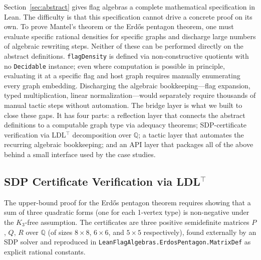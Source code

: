\documentclass{article}
\newcommand{\Q}{\mathbb{Q}}
\newcommand{\lean}[1]{\texttt{#1}}
\begin{document}
Section~\ref{sec:abstract} gives flag algebras a complete mathematical
specification in Lean.  The difficulty is that this specification cannot
drive a concrete proof on its own.  To prove Mantel's theorem or the
Erd\H{o}s pentagon theorem, one must evaluate specific rational densities
for specific graphs and discharge large numbers of algebraic
rewriting steps.  Neither of these can be performed directly on the
abstract definitions.  \lean{flagDensity} is defined via non-constructive
quotients with no \lean{Decidable} instance; even where computation is
possible in principle, evaluating it at a specific flag and host graph
requires manually enumerating every graph embedding.  Discharging the
algebraic bookkeeping---flag expansion, typed multiplication, linear
normalization---would separately require thousands of manual tactic steps
without automation.  The bridge layer is what we built
to close these gaps.  It has four parts: a reflection layer that connects
the abstract definitions to a computable graph type via adequacy theorems;
SDP-certificate verification via LDL$^\top$ decomposition over $\Q$; a
tactic layer that automates the recurring algebraic bookkeeping; and an API
layer that packages all of the above behind a small interface used by the
case studies.

\subsection{SDP Certificate Verification via \texorpdfstring{LDL$^\top$}{LDL\string^T}}
\label{sec:sdp}

The upper-bound proof for the Erd\H{o}s pentagon theorem requires showing
that a sum of three quadratic forms (one for each 1-vertex type) is
non-negative under the $K_3$-free assumption.  The certificates are three
positive semidefinite matrices $P$, $Q$, $R$ over $\Q$ (of sizes
$8 \times 8$, $6 \times 6$, and $5 \times 5$ respectively), found
externally by an SDP solver and reproduced in
\lean{LeanFlagAlgebras.ErdosPentagon.MatrixDef} as explicit rational
constants.
\end{document}
